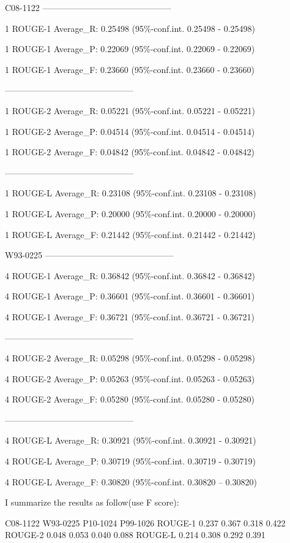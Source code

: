 \documentclass[hyp]{socreport}
\begin{document}
C08-1122
---------------------------------------------

1 ROUGE-1 Average\_R: 0.25498 (95\%-conf.int. 0.25498 - 0.25498)

1 ROUGE-1 Average\_P: 0.22069 (95\%-conf.int. 0.22069 - 0.22069)

1 ROUGE-1 Average\_F: 0.23660 (95\%-conf.int. 0.23660 - 0.23660)

---------------------------------------------

1 ROUGE-2 Average\_R: 0.05221 (95\%-conf.int. 0.05221 - 0.05221)

1 ROUGE-2 Average\_P: 0.04514 (95\%-conf.int. 0.04514 - 0.04514)

1 ROUGE-2 Average\_F: 0.04842 (95\%-conf.int. 0.04842 - 0.04842)

---------------------------------------------

1 ROUGE-L Average\_R: 0.23108 (95\%-conf.int. 0.23108 - 0.23108)

1 ROUGE-L Average\_P: 0.20000 (95\%-conf.int. 0.20000 - 0.20000)

1 ROUGE-L Average\_F: 0.21442 (95\%-conf.int. 0.21442 - 0.21442)



W93-0225
---------------------------------------------

4 ROUGE-1 Average\_R: 0.36842 (95\%-conf.int. 0.36842 - 0.36842)

4 ROUGE-1 Average\_P: 0.36601 (95\%-conf.int. 0.36601 - 0.36601)

4 ROUGE-1 Average\_F: 0.36721 (95\%-conf.int. 0.36721 - 0.36721)

---------------------------------------------

4 ROUGE-2 Average\_R: 0.05298 (95\%-conf.int. 0.05298 - 0.05298)

4 ROUGE-2 Average\_P: 0.05263 (95\%-conf.int. 0.05263 - 0.05263)

4 ROUGE-2 Average\_F: 0.05280 (95\%-conf.int. 0.05280 - 0.05280)

---------------------------------------------

4 ROUGE-L Average\_R: 0.30921 (95\%-conf.int. 0.30921 - 0.30921)

4 ROUGE-L Average\_P: 0.30719 (95\%-conf.int. 0.30719 - 0.30719)

4 ROUGE-L Average\_F: 0.30820 (95\%-conf.int. 0.30820 – 0.30820)


I summarize the results as follow(use F score):

           C08-1122     W93-0225     P10-1024     P99-1026
ROUGE-1     0.237        0.367        0.318        0.422    
ROUGE-2     0.048        0.053        0.040        0.088
ROUGE-L     0.214        0.308        0.292        0.391
\end{document}
